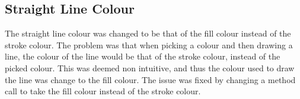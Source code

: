 \subsection{Straight Line Colour}
The straight line colour was changed to be that of the fill colour instead of the stroke colour.
The problem was that when picking a colour and then drawing a line, the colour of the line would be that of the stroke colour, instead of the picked colour.
This was deemed non intuitive, and thus the colour used to draw the line was change to the fill colour.
The issue was fixed by changing a method call to take the fill colour instead of the stroke colour.